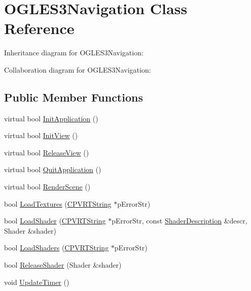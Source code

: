 \hypertarget{class_o_g_l_e_s3_navigation}{\section{O\+G\+L\+E\+S3\+Navigation Class Reference}
\label{class_o_g_l_e_s3_navigation}
}


Inheritance diagram for O\+G\+L\+E\+S3\+Navigation\+:


Collaboration diagram for O\+G\+L\+E\+S3\+Navigation\+:
\subsection*{Public Member Functions}
\begin{DoxyCompactItemize}
\item 
virtual bool \hyperlink{class_o_g_l_e_s3_navigation_a7207a07b119004ef40e4ad74bf2bb579}{Init\+Application} ()
\item 
virtual bool \hyperlink{class_o_g_l_e_s3_navigation_a3580514be9eda33c2bee147129c07470}{Init\+View} ()
\item 
virtual bool \hyperlink{class_o_g_l_e_s3_navigation_aae631a4ef6a8f2732e3f84257cb30ed0}{Release\+View} ()
\item 
virtual bool \hyperlink{class_o_g_l_e_s3_navigation_ab028c1e2ffa09f656c877e0568426c5c}{Quit\+Application} ()
\item 
virtual bool \hyperlink{class_o_g_l_e_s3_navigation_adc2f329993dc21bfecab7f79b1ebecb6}{Render\+Scene} ()
\item 
bool \hyperlink{class_o_g_l_e_s3_navigation_ac683cfcf3d2bcaaa5c6ead232405e83b}{Load\+Textures} (\hyperlink{class_c_p_v_r_t_string}{C\+P\+V\+R\+T\+String} $\ast$p\+Error\+Str)
\item 
bool \hyperlink{class_o_g_l_e_s3_navigation_a9516caab3486c5fba4a6b8e4e13e8ac5}{Load\+Shader} (\hyperlink{class_c_p_v_r_t_string}{C\+P\+V\+R\+T\+String} $\ast$p\+Error\+Str, const \hyperlink{struct_shader_description}{Shader\+Description} \&descr, Shader \&shader)
\item 
bool \hyperlink{class_o_g_l_e_s3_navigation_a62d1941e4b538c786c482378156f4c3b}{Load\+Shaders} (\hyperlink{class_c_p_v_r_t_string}{C\+P\+V\+R\+T\+String} $\ast$p\+Error\+Str)
\item 
bool \hyperlink{class_o_g_l_e_s3_navigation_a9d8df4f3f2fb4de39508c08e2afb6b65}{Release\+Shader} (Shader \&shader)
\item 
void \hyperlink{class_o_g_l_e_s3_navigation_a278e0192e50c73ce8c676df29a90fc2f}{Update\+Timer} ()

\end{DoxyCompactItemize}

